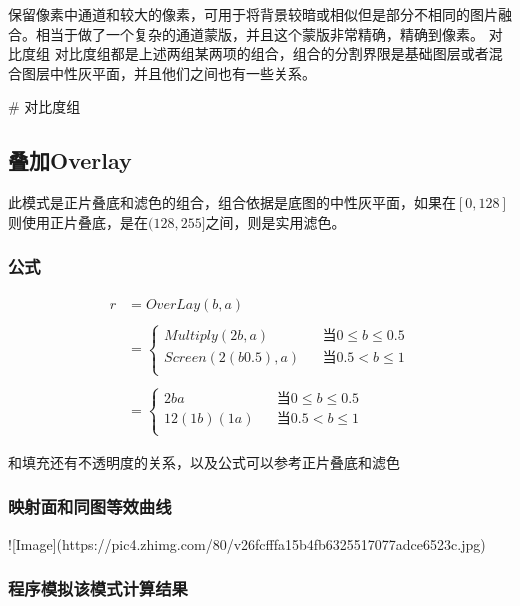 保留像素中通道和较大的像素，可用于将背景较暗或相似但是部分不相同的图片融合。相当于做了一个复杂的通道蒙版，并且这个蒙版非常精确，精确到像素。
对比度组
对比度组都是上述两组某两项的组合，组合的分割界限是基础图层或者混合图层中性灰平面，并且他们之间也有一些关系。

# 对比度组

\subsection{ 叠加Overlay}

此模式是正片叠底和滤色的组合，组合依据是底图的中性灰平面，如果在$[0,128]$则使用正片叠底，是在$(128,255]$之间，则是实用滤色。

\subsubsection{ 公式}

$$\begin{aligned}r&=OverLay(b,a)\\\\&=\left\{\begin{aligned}Multiply(2b,a)&&当 0\leq b \leq 0.5\\Screen(2(b0.5),a)&&当 0.5< b \leq 1\\\end{aligned}\right.\\\\&=\left\{\begin{aligned}2ba&&当 0\leq b \leq 0.5\\12(1b)(1a)&&当 0.5< b \leq 1\\\end{aligned}\right.\end{aligned}$$

和填充还有不透明度的关系，以及公式可以参考正片叠底和滤色

\subsubsection{ 映射面和同图等效曲线}

![Image](https://pic4.zhimg.com/80/v26fcfffa15b4fb6325517077adce6523c.jpg)

\subsubsection{ 程序模拟该模式计算结果}

